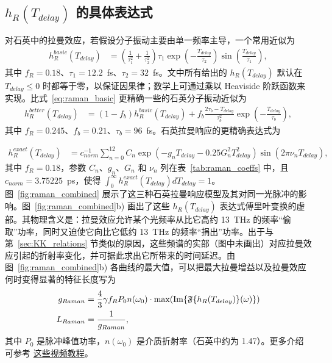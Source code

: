 \subsection[hR 的具体表达式]{$h_R(T_{delay})$ 的具体表达式}
对石英中的拉曼效应，若假设分子振动主要由单一频率主导，一个常用近似为
\begin{align}
\label{eq:raman_basic}
    h_R^{basic}(T_{delay})&= \left(\frac{1}{\tau_1^{2}}+\frac{1}{\tau_2^{2}} \right)\tau_1\exp\left(-\frac{T_{delay}}{\tau_2}\right)\sin\left(\frac{T_{delay}}{\tau_1}\right),
\end{align}
其中 $f_R=0.18$、$\tau_1=12.2$~fs、$\tau_2=32$~fs。文中所有给出的 $h_R(T_{delay})$ 默认在 $T_{delay}\leq0$ 时都等于零，以保证因果律；数学上可通过乘以 Heaviside 阶跃函数来实现。比式~\ref{eq:raman_basic} 更精确一些的石英分子振动近似为
\begin{align}
\label{eq:raman_new}
    h_R^{better}(T_{delay})&= (1-f_b) h_R^{basic}(T_{delay})+f_b\frac{2\tau_b-T_{delay}}{\tau_b^2}\exp\left(-\frac{T_{delay}}{\tau_b}\right),
\end{align}
其中 $f_R=0.245$、$f_b=0.21$、$\tau_b=96$~fs。石英拉曼响应的更精确表达式为

\begin{align}
\label{eq:Raman_exact}
    h_R^{exact}(T_{delay})&=c^{-1}_{norm}\sum_{n=0}^{12}C_n\exp\left(- g_nT_{delay}-0.25G_n^2T^2_{delay}  \right)\sin\left(2\pi \nu_nT_{delay} \right),
\end{align}
其中 $f_R=0.18$，参数 $C_n$、$g_n$、$G_n$ 和 $\nu_n$ 列在表~\ref{tab:raman_coeffs} 中，且 $c_{norm}=3.75225$~ps，使得 $\int_0^\infty h_R^{exact}(T_{delay}) dT_{delay}=1$。图~\ref{fig:raman_combined} 展示了这三种石英拉曼响应模型及其对同一光脉冲的影响。图~\ref{fig:raman_combined}b) 画出了这些 $h_R(T_{delay})$ 表达式傅里叶变换的虚部。其物理含义是：拉曼效应允许某个光频率从比它高约 13~THz 的频率“偷取”功率，同时又迫使它向比它低约 13~THz 的频率“捐出”功率。出于与第~\ref{sec:KK_relations} 节类似的原因，这些频谱的实部（图中未画出）对应拉曼效应引起的折射率变化，并可据此求出它所带来的时间延迟。由图~\ref{fig:raman_combined}b) 各曲线的最大值，可以把最大拉曼增益以及拉曼效应何时变得显著的特征长度写为
\begin{align}
    g_{Raman} &= \frac{4}{3} \gamma f_R P_0 n(\omega_0)\cdot \text{max}( \text{Im} \{ \mathfrak{F} \{ h_R(T_{delay}) \}(\omega) \} )\\
    L_{Raman} &= \frac{1}{g_{Raman}},
\end{align}
其中 $P_0$ 是脉冲峰值功率，$n(\omega_0)$ 是介质折射率（石英中约为 1.47）。更多介绍可参考 \href{https://www.youtube.com/playlist?list=PLdFybGSAoPnn6tnSmptR71zKAgcKsjIfi}{这些视频教程}。

